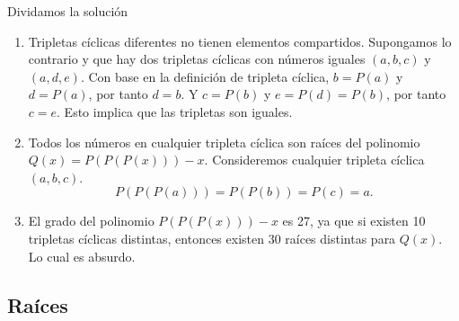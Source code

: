 \begin{solution}
    Dividamos la solución
    \begin{enumerate}
        \item Tripletas cíclicas diferentes no tienen elementos compartidos.
        Supongamos lo contrario y que hay dos tripletas cíclicas con números iguales $(a, b, c)$ y $(a, d, e)$.
        Con base en la definición de tripleta cíclica, $b = P(a)$ y $d = P(a)$, por tanto $d = b$.
        Y $c = P(b)$ y $e = P(d) = P(b)$, por tanto $c = e$.
        Esto implica que las tripletas son iguales.
        \item Todos los números en cualquier tripleta cíclica son raíces del polinomio $Q(x) = P(P(P(x))) - x$.
        Consideremos cualquier tripleta cíclica $(a, b, c)$.
        \[
            P(P(P(a))) = P(P(b)) = P(c) = a.
        \]
        \item El grado del polinomio $P(P(P(x))) - x$ es 27, ya que si existen 10 tripletas cíclicas distintas, entonces existen 30 raíces distintas para $Q(x)$.
        Lo cual es absurdo. \qedhere
    \end{enumerate}
\end{solution}

\subsection{Raíces}
